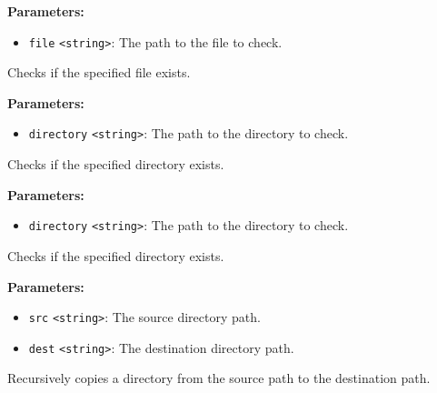 \documentclass[12pt,a4paper]{article}
\begin{document}
\noindent \textbf{Parameters:}
\begin{itemize}
  \item \texttt{file} \texttt{<string>}: The path to the file to check.
\end{itemize}

\noindent Checks if the specified file exists.

\vspace{5mm}
\noindent {}


\noindent \textbf{Parameters:}
\begin{itemize}
  \item \texttt{directory} \texttt{<string>}: The path to the directory to check.
\end{itemize}

\noindent Checks if the specified directory exists.

\vspace{5mm}
\noindent {}


\noindent \textbf{Parameters:}
\begin{itemize}
  \item \texttt{directory} \texttt{<string>}: The path to the directory to check.
\end{itemize}

\noindent Checks if the specified directory exists.

\vspace{5mm}
\noindent {}


\noindent \textbf{Parameters:}
\begin{itemize}
  \item \texttt{src} \texttt{<string>}: The source directory path.
  \item \texttt{dest} \texttt{<string>}: The destination directory path.
\end{itemize}

\noindent Recursively copies a directory from the source path to the destination path.

\vspace{5mm}
\noindent {}
\end{document}
